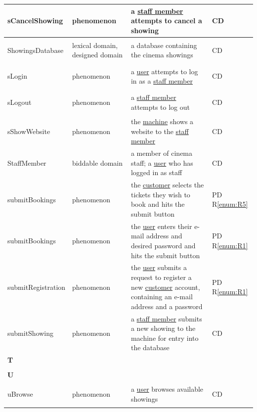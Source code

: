 \documentclass[a4paper,10pt,titlepage,bibtotoc,bibtotocnumbered]{scrreprt}
\begin{document}
\begin{longtable}{|l|p{3cm}|p{5cm}|l|}
\hline
\hypertarget{glossary:sCancelShowing}{sCancelShowing} & phenomenon & a \hyperlink{glossary:StaffMember}{staff member} attempts to cancel a showing & CD\\
\hline
\hypertarget{glossary:ShowingsDatabase}{ShowingsDatabase} & lexical domain, designed domain & a database containing the cinema showings & CD\\
\hline
\hypertarget{glossary:sLogin}{sLogin} & phenomenon & a \hyperlink{glossary:User}{user} attempts to log in as a \hyperlink{glossary:StaffMember}{staff member} & CD\\
\hline
\hypertarget{glossary:sLogout}{sLogout} & phenomenon & a \hyperlink{glossary:StaffMember}{staff member} attempts to log out & CD\\
\hline
\hypertarget{glossary:sShowWebsite}{sShowWebsite} & phenomenon & the \hyperlink{glossary:UDEKino}{machine} shows a website to the \hyperlink{glossary:StaffMember}{staff member} & CD\\
\hline
\hypertarget{glossary:StaffMember}{StaffMember} & biddable domain & a member of cinema staff; a \hyperlink{glossary:User}{user} who has logged in as staff & CD\\
\hline
\hypertarget{glossary:submitBookings}{submitBookings} & phenomenon & the \hyperlink{glossary:Customer}{customer} selects the tickets they wish to book and hits the submit button &  PD R\ref{enum:R5}\\
\hline
\hypertarget{glossary:submitRegistration}{submitBookings} & phenomenon & the \hyperlink{glossary:User}{user} enters their e-mail address and desired password and hits the submit button & PD R\ref{enum:R1}\\
\hline
\hypertarget{glossary:submitRegistration}{submitRegistration} & phenomenon & the \hyperlink{glossary:User}{user} submits a request to register a new \hyperlink{glossary:Customer}{customer} account, containing an e-mail address and a password & PD R\ref{enum:R1}\\
\hline
\hypertarget{glossary:submitShowing}{submitShowing} & phenomenon & a \hyperlink{glossary:StaffMember}{staff member} submits a new showing to the machine for entry into the database & CD\\
\hline
\multicolumn{4}{|l|}{\textbf{T}}\\
\hline
&  &  & \\
\hline
\multicolumn{4}{|l|}{\textbf{U}}\\
\hline
\hypertarget{glossary:uBrowse}{uBrowse} & phenomenon & a \hyperlink{glossary:User}{user} browses available showings & CD\\

\end{longtable}
\end{document}
